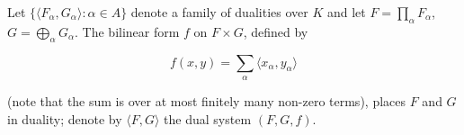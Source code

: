 Let $\{ \langle F_\alpha, G_\alpha \rangle : \alpha \in A \}$ denote a family of dualities over $K$ and let $F = \prod_\alpha F_\alpha$, $G = \bigoplus_\alpha G_\alpha$. The bilinear form $f$ on $F \times G$, defined by

$$f(x, y) = \sum_\alpha \langle x_\alpha, y_\alpha \rangle$$

(note that the sum is over at most finitely many non-zero terms), places $F$ and $G$ in duality; denote by $\langle F, G \rangle$ the dual system $(F, G, f)$.
